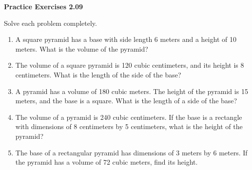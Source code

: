 \vspace{0.3ex}
\noindent\textbf{Practice Exercises 2.09}

\vspace{0.2ex}

Solve each problem completely.

\begin{enumerate}[noitemsep, label = \color{blue}\arabic*. ]
    \item A square pyramid has a base with side length 6 meters and a height of 10 meters. What is the volume of the pyramid?
    \item The volume of a square pyramid is 120 cubic centimeters, and its height is 8 centimeters. What is the length of the side of the base?
    \item A pyramid has a volume of 180 cubic meters. The height of the pyramid is 15 meters, and the base is a square. What is the length of a side of the base?
    \item The volume of a pyramid is 240 cubic centimeters. If the base is a rectangle with dimensions of 8 centimeters by 5 centimeters, what is the height of the pyramid?
    \item The base of a rectangular pyramid has dimensions of 3 meters by 6 meters. If the pyramid has a volume of 72 cubic meters, find its height.
\end{enumerate}

